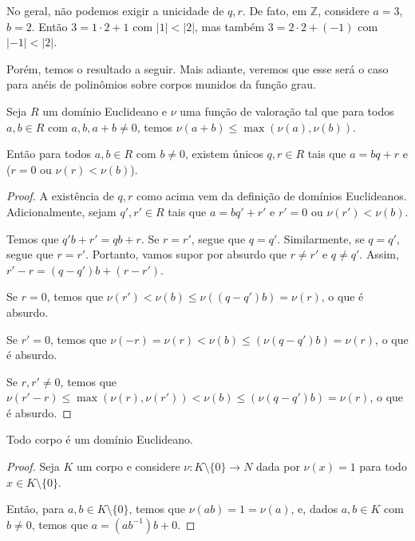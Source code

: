 \begin{exemplo}
    No geral, não podemos exigir a unicidade de $q, r$.
    De fato, em $\mathbb Z$, considere $a=3$, $b=2$.
    Então $3=1\cdot 2+1$ com $|1|<|2|$, mas também $3=2\cdot 2+(-1)$ com $|-1|<|2|$.
\end{exemplo}

Porém, temos o resultado a seguir.
Mais adiante, veremos que esse será o caso para anéis de polinômios sobre corpos munidos da função grau.


\begin{prop}
    Seja $R$ um domínio Euclideano e $\nu$ uma função de valoração tal que
    para todos $a, b\in R$ com $a, b, a+b\neq 0$, temos $\nu(a+b)\leq \max(\nu(a), \nu(b))$.
    
    Então para todos $a, b \in R$ com $b\neq 0$, existem únicos $q, r \in R$ tais que $a=bq+r$ e ($r=0$ ou $\nu(r)<\nu(b)$).
\end{prop}
\begin{proof}
    A existência de $q, r$ como acima vem da definição de domínios Euclideanos.
    Adicionalmente, sejam $q', r' \in R$ tais que $a=bq'+r'$ e $r'=0$ ou $\nu(r')<\nu(b)$.

    Temos que $q'b+r'=qb+r$.
    Se $r=r'$, segue que $q=q'$.
    Similarmente, se $q=q'$, segue que $r=r'$.
    Portanto, vamos supor por absurdo que $r\neq r'$ e $q\neq q'$.
    Assim, $r'-r=(q-q')b+(r-r')$.
    
    Se $r=0$, temos que $\nu(r')<\nu(b)\leq \nu((q-q')b)=\nu(r)$, o que é absurdo.

    Se $r'=0$, temos que $\nu(-r)=\nu(r)<\nu(b)\leq(\nu(q-q')b)=\nu(r)$, o que é absurdo.
    
    Se $r, r'\neq 0$, temos que $\nu(r'-r)\leq \max(\nu(r), \nu(r'))<\nu(b)\leq(\nu(q-q')b)=\nu(r)$, o que é absurdo.
\end{proof}

\begin{prop}
    Todo corpo é um domínio Euclideano.
\end{prop}
\begin{proof}
Seja $K$ um corpo e considere $\nu:K\setminus \{0\}\to N$ dada por $\nu(x)=1$ para todo $x\in K\setminus \{0\}$.

    Então, para $a, b \in K\setminus \{0\}$, temos que $\nu(ab)=1=\nu(a)$,
    e, dados $a, b\in K$ com $b\neq 0$, temos que $a=(ab^{-1})b+0$.
\end{proof}

